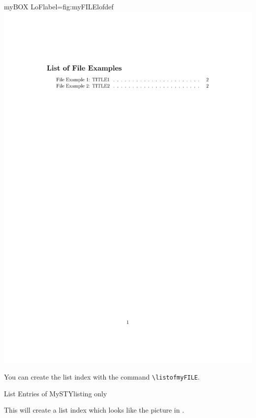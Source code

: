 \documentclass[]{myHOWTO-V001}
\begin{document}
\begin{minipage}{0.46\linewidth}
\centering
\begin{myFIGlst}{myBOX LoF}{label={fig:myFILElofdef}}
	\includegraphics[page=1,scale=0.18]{examples/myFILEV000.pdf}
\end{myFIGlst}
\end{minipage}
\begin{minipage}{0.46\linewidth}
You can create the list index with the command \Verb|\listofmyFILE|.

\begin{myTEXEXdoclst}{List Entries of MySTY}{listing only}
\listofmyFILE
\end{myTEXEXdoclst}

This will create a list index which looks like the picture in . 
\end{minipage}
\end{document}
